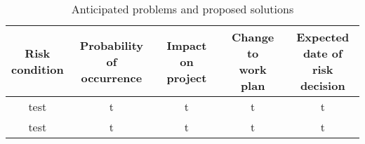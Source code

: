\begin{table}
\caption{\label{tab:contingency}Anticipated problems and proposed solutions}
\begin{tabular}{c|c|c|c|c}
\parbox[t]{2cm}{Risk\\condition} & \parbox[t]{2.5cm}{Probability\\of occurrence} & \parbox[t]{3cm}{Impact on\\project} & \parbox[t]{3cm}{Change to\\work plan} & \parbox[t]{2.4cm}{Expected\\date of risk\\decision}\\[1.6cm]

\hline

test&t&t&t&t\\
test&t&t&t&t
\end{tabular}
\end{table}